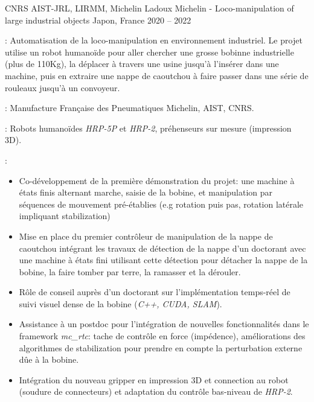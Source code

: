 \begin{cventries}
  \cventry
  {CNRS AIST-JRL, LIRMM, Michelin Ladoux} %
  {Michelin - Loco-manipulation of large industrial objects} %
  {Japon, France} %
  {2020 -- 2022} %
  {
    \begin{cvitems}
    \item {} : Automatisation de la loco-manipulation en environnement
      industriel. Le projet utilise un robot humanoïde pour aller chercher une grosse bobinne industrielle
      (plus de 110Kg), la déplacer à travers une usine jusqu'à l'insérer dans une machine, puis en extraire
      une nappe de caoutchou à faire passer dans une série de rouleaux jusqu'à un convoyeur.
    \item {} : Manufacture Française des Pneumatiques Michelin, AIST, CNRS.
    \item {} : Robots humanoïdes \emph{HRP-5P} et
      \emph{HRP-2}, préhenseurs sur mesure (impression 3D).
    \item {} :
      \begin{itemize}
        \item Co-développement de la première démonstration du projet: une machine à états finis alternant
          marche, saisie de la bobine, et manipulation par séquences de mouvement pré-établies (e.g rotation
          puis pas, rotation latérale impliquant stabilization)
        \item Mise en place du premier contrôleur de manipulation de la nappe de caoutchou intégrant les
          travaux de détection de la nappe d'un doctorant avec une machine à états fini utilisant cette
          détection pour détacher la nappe de la bobine, la faire tomber par terre, la ramasser et la dérouler.
        \item Rôle de conseil auprès d'un doctorant sur l'implémentation temps-réel de suivi visuel dense de
          la bobine (\emph{C++, CUDA, SLAM}).
        \item Assistance à un postdoc pour l'intégration de nouvelles fonctionnalités dans le framework
          \emph{mc\_rtc}: tache de contrôle en force (impédence), améliorations des algorithmes de
          stabilization pour prendre en compte la perturbation externe dûe à la bobine.
        \item Intégration du nouveau gripper en impression 3D et connection au robot (soudure de connecteurs)
          et adaptation du contrôle bas-niveau de \emph{HRP-2}.

\end{itemize}
\end{cvitems}}
\end{cventries}
